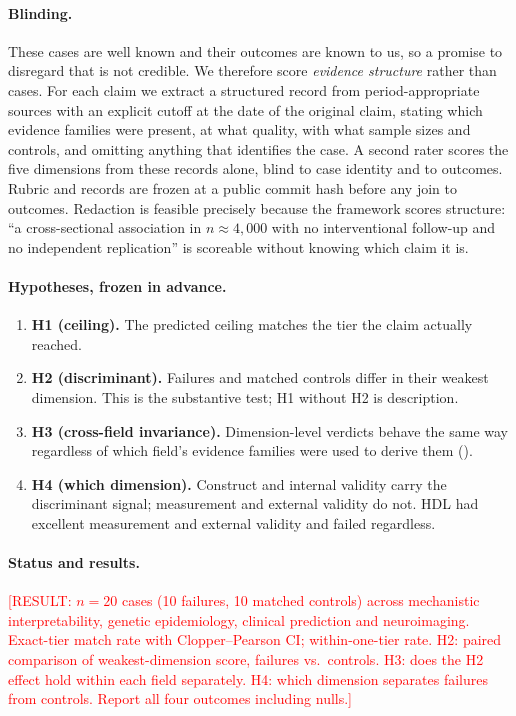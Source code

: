 \documentclass{article}
\begin{document}
\paragraph{Blinding.} These cases are well known and their outcomes are known to us, so a promise to disregard that is not credible. We therefore score \emph{evidence structure} rather than cases. For each claim we extract a structured record from period-appropriate sources with an explicit cutoff at the date of the original claim, stating which evidence families were present, at what quality, with what sample sizes and controls, and omitting anything that identifies the case. A second rater scores the five dimensions from these records alone, blind to case identity and to outcomes. Rubric and records are frozen at a public commit hash before any join to outcomes. Redaction is feasible precisely because the framework scores structure: ``a cross-sectional association in $n\approx4{,}000$ with no interventional follow-up and no independent replication'' is scoreable without knowing which claim it is.

\paragraph{Hypotheses, frozen in advance.}
\begin{enumerate}[nosep]
\item \textbf{H1 (ceiling).} The predicted ceiling matches the tier the claim actually reached.
\item \textbf{H2 (discriminant).} Failures and matched controls differ in their weakest dimension. This is the substantive test; H1 without H2 is description.
\item \textbf{H3 (cross-field invariance).} Dimension-level verdicts behave the same way regardless of which field's evidence families were used to derive them ().
\item \textbf{H4 (which dimension).} Construct and internal validity carry the discriminant signal; measurement and external validity do not. HDL had excellent measurement and external validity and failed regardless.
\end{enumerate}

\paragraph{Status and results.}
\textcolor{red}{[RESULT: $n=20$ cases (10 failures, 10 matched controls) across mechanistic interpretability, genetic epidemiology, clinical prediction and neuroimaging. Exact-tier match rate with Clopper--Pearson CI; within-one-tier rate. H2: paired comparison of weakest-dimension score, failures vs.\ controls. H3: does the H2 effect hold within each field separately. H4: which dimension separates failures from controls. Report all four outcomes including nulls.]}
\end{document}
